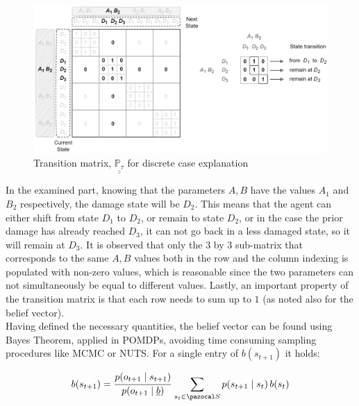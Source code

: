 \begin{figure}[H]
    \centering
	\includegraphics[width=\linewidth]{Figures/transMatFocus.png}
	\caption{Transition matrix, $\underline{\underline{\mathbb{P}_{\tau}}}$ for discrete case explanation} 
	\label{transMatDiscV2}
\end{figure}

In the examined part, knowing that the parameters $A, B$ have the values $A_1$ and $B_2$ respectively, the damage state will be $D_2$. This means that the agent can either shift from state $D_1$ to $D_2$, or remain to state $D_2$, or in the case the prior damage has already reached $D_3$, it can not go back in a less damaged state, so it will remain at $D_3$. It is observed that only the $3$ by $3$ sub-matrix that corresponds to the same $A, B$ values both in the row and the column indexing is populated with non-zero values, which is reasonable since the two parameters can not simultaneously be equal to different values. Lastly, an important property of the transition matrix is that each row needs to sum up to $1$ (as noted also for the belief vector).\\



Having defined the necessary quantities, the belief vector can be found using Bayes Theorem, applied in \glspl{POMDP}, avoiding time consuming sampling procedures like \gls{MCMC} or \gls{NUTS}. For a single entry of $b(s_{t+1})$ it holds:

\begin{equation}
    b(s_{t+1}) = \cfrac{p(o_{t+1}\mid s_{t+1})}{p(o_{t+1}\mid \underline{b})} \, \sum _{s_t\in \ccal{S}} p(s_{t+1}\mid s_t) \, b(s_t) \label{beliefOne}
\end{equation}

